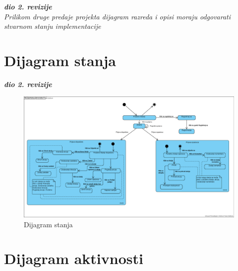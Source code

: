 			\textbf{\textit{dio 2. revizije}}\\			
			
			\textit{Prilikom druge predaje projekta dijagram razreda i opisi moraju odgovarati stvarnom stanju implementacije}
			
			
			
			\eject
		
		\section{Dijagram stanja}
			
			
			\textbf{\textit{dio 2. revizije}}\\
			
			\begin{figure}[H]
				\includegraphics[scale=0.32]{slike/stanja.PNG}
				\centering
				\caption{Dijagram stanja}
				\label{fig:dijagram_stanja}
			\end{figure}
			
			
			\eject 
		
		\section{Dijagram aktivnosti}
			
